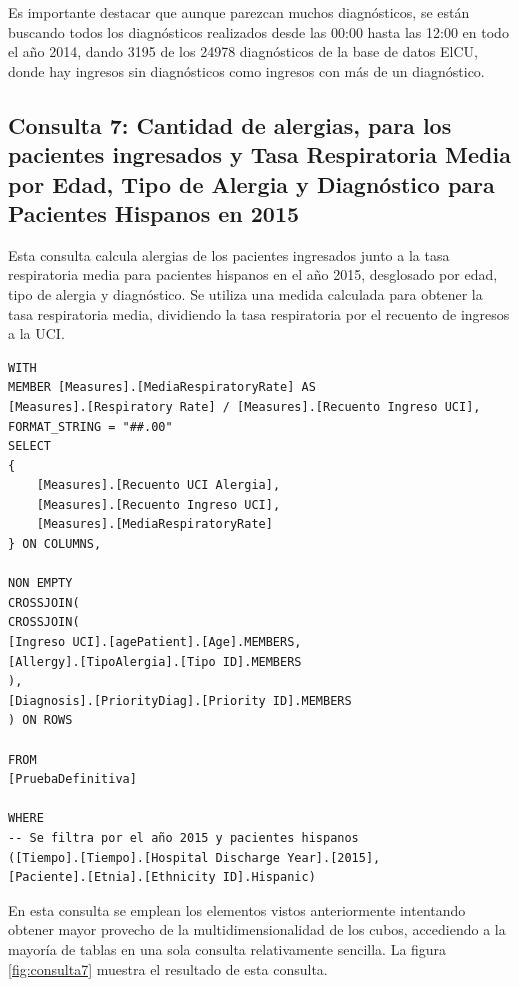 \documentclass[12pt, a4paper, twoside]{article}
\begin{document}
	Es importante destacar que aunque parezcan muchos diagnósticos, se están buscando todos los diagnósticos realizados desde las 00:00 hasta las 12:00 en todo el año 2014, dando 3195 de los 24978 diagnósticos de la base de datos ElCU, donde hay ingresos sin diagnósticos como ingresos con más de un diagnóstico.
	
	\subsection{Consulta 7: Cantidad de alergias, para los pacientes ingresados y Tasa Respiratoria Media por Edad, Tipo de Alergia y Diagnóstico para Pacientes Hispanos en 2015}
	
	Esta consulta calcula alergias de los pacientes ingresados junto a  la tasa respiratoria media para pacientes hispanos en el año 2015, desglosado por edad, tipo de alergia y diagnóstico. Se utiliza una medida calculada para obtener la tasa respiratoria media, dividiendo la tasa respiratoria por el recuento de ingresos a la UCI.
	
	\begin{verbatim}
WITH 
MEMBER [Measures].[MediaRespiratoryRate] AS
[Measures].[Respiratory Rate] / [Measures].[Recuento Ingreso UCI],
FORMAT_STRING = "##.00"
SELECT 
{ 
	[Measures].[Recuento UCI Alergia],
	[Measures].[Recuento Ingreso UCI],
	[Measures].[MediaRespiratoryRate]
} ON COLUMNS,

NON EMPTY 
CROSSJOIN(
CROSSJOIN(
[Ingreso UCI].[agePatient].[Age].MEMBERS, 
[Allergy].[TipoAlergia].[Tipo ID].MEMBERS
),
[Diagnosis].[PriorityDiag].[Priority ID].MEMBERS 
) ON ROWS

FROM 
[PruebaDefinitiva]

WHERE 
-- Se filtra por el año 2015 y pacientes hispanos 
([Tiempo].[Tiempo].[Hospital Discharge Year].[2015], 
[Paciente].[Etnia].[Ethnicity ID].Hispanic)

	\end{verbatim}
	
	En esta consulta se emplean los elementos vistos anteriormente intentando obtener mayor provecho de la multidimensionalidad de los cubos, accediendo a la mayoría de tablas en una sola consulta relativamente sencilla. La figura \ref{fig:consulta7} muestra el resultado de esta consulta.
	
\end{document}
